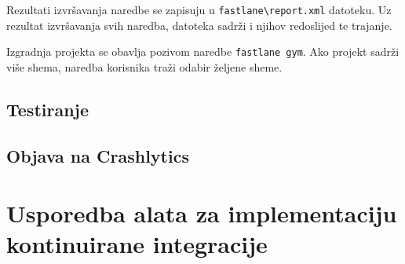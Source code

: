 \documentclass[times, utf8, diplomski, numeric]{fer}
\begin{document}
\begin{appendices}
Rezultati izvršavanja naredbe se zapisuju u \verb|fastlane\report.xml| datoteku. Uz rezultat izvršavanja svih naredba, datoteka sadrži i njihov redoslijed te trajanje.

Izgradnja projekta se obavlja pozivom naredbe \verb|fastlane gym|. Ako projekt sadrži više shema, naredba korisnika traži odabir željene sheme.

\section{Testiranje}



\section{Objava na Crashlytics}








\chapter{Usporedba alata za implementaciju kontinuirane integracije} \label{UsporedbaCIAlata_DodatakC}

\end{appendices}
\end{document}
